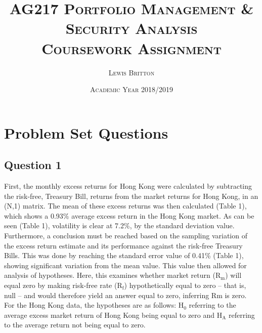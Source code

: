 \documentclass[11pt, english]{article}
\begin{document}

        \title{\textsc{AG217 Portfolio Management \& Security Analysis\\ Coursework Assignment}}
        \author{\textsc{Lewis Britton}}
        \date{\textsc{Academic Year 2018/2019}}
        \maketitle

\newpage


        \renewcommand{\contentsname}{Table of Contents}

        \tableofcontents

\newpage


\section{Problem Set Questions}

	\subsection{Question 1}

	First, the monthly excess returns for Hong Kong were calculated by subtracting the risk-free, Treasury Bill, returns from the market returns for Hong Kong, in an (N,1) matrix. The mean of these excess returns was then calculated (Table 1), which shows a 0.93\% average excess return in the Hong Kong market. As can be seen (Table 1), volatility is clear at 7.2\%, by the standard deviation value.\\

	Furthermore, a conclusion must be reached based on the sampling variation of the excess return estimate and its performance against the risk-free Treasury Bills. This was done by reaching the standard error value of 0.41\% (Table 1), showing significant variation from the mean value. This value then allowed for analysis of hypotheses. Here, this examines whether market return (R$\mathrm{_m}$) will equal zero by making risk-free rate (R$\mathrm{_f}$) hypothetically equal to zero – that is, null – and would therefore yield an answer equal to zero, inferring Rm is zero.  For the Hong Kong data, the hypotheses are as follows: H$_0$ referring to the average excess market return of Hong Kong being equal to zero and H$\mathrm{_A}$ referring to the average return not being equal to zero.\\
\end{document}

